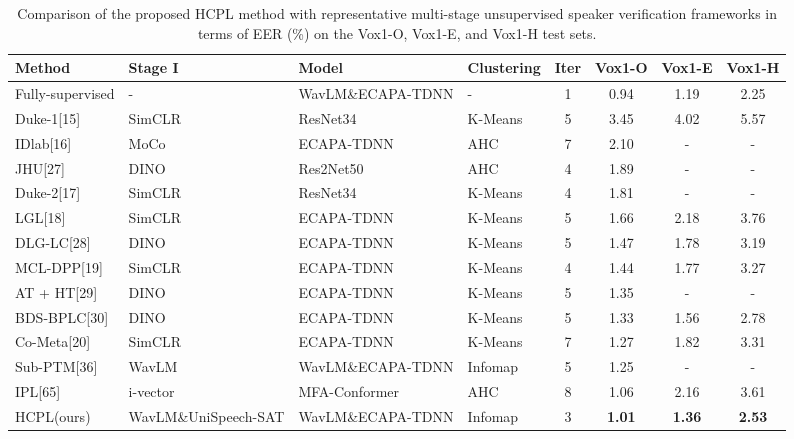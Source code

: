 \documentclass[lettersize,journal]{IEEEtran}
\begin{document}
\begin{table}[t] %
    \centering
    \caption{Comparison of the proposed HCPL method with representative multi-stage unsupervised speaker verification frameworks in terms of EER (\%) on the Vox1-O, Vox1-E, and Vox1-H test sets.} %
    \setlength{\tabcolsep}{10pt} %
    \begin{tabular}{l l l l c c c c} %
        \hline
        Method & Stage I & Model & Clustering & Iter & Vox1-O & Vox1-E & Vox1-H  \\
        \hline
        Fully-supervised & - & WavLM\&ECAPA-TDNN& -&1   & 0.94 & 1.19 & 2.25   \\  
        \hline
        Duke-1[15] & SimCLR &ResNet34 &K-Means& 5   & 3.45 & 4.02 & 5.57\\ 
        IDlab[16] & MoCo&ECAPA-TDNN &AHC & 7   & 2.10 & - & -   \\ 
        JHU[27] & DINO&Res2Net50 &AHC & 4   & 1.89 & - & -   \\ 
        Duke-2[17] &SimCLR& ResNet34& K-Means &4   & 1.81 & - & -   \\ 
        LGL[18]  & SimCLR&ECAPA-TDNN &K-Means& 5   & 1.66 & 2.18 & 3.76   \\ 
        DLG-LC[28]  & DINO &ECAPA-TDNN &K-Means& 5   & 1.47 & 1.78 & 3.19   \\ 
        MCL-DPP[19]& SimCLR &ECAPA-TDNN &K-Means& 4   & 1.44 & 1.77 & 3.27   \\ 
        AT + HT[29]  & DINO &ECAPA-TDNN &K-Means& 5   & 1.35 & - & -   \\ 
        BDS-BPLC[30] & DINO &ECAPA-TDNN&K-Means& 5   & 1.33 & 1.56 & 2.78   \\ 
        Co-Meta[20] & SimCLR &ECAPA-TDNN&K-Means& 7   & 1.27 & 1.82 & 3.31   \\ 
        Sub-PTM[36] & WavLM & WavLM\&ECAPA-TDNN&Infomap & 5   & 1.25 & - & -   \\ 
        IPL[65] &i-vector &MFA-Conformer&  AHC &8   & 1.06 & 2.16 & 3.61   \\ 
        HCPL(ours) &WavLM\&UniSpeech-SAT & WavLM\&ECAPA-TDNN&Infomap& 3   & \textbf{1.01} & \textbf{1.36} & \textbf{2.53}   \\
        \hline
    \end{tabular}
    \label{tab:multi-stage comparison}
\end{table}
\FloatBarrier



\end{document}
